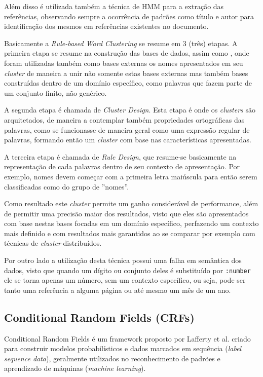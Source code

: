 Além disso é utilizada também a técnica de HMM \cite{Rabiner-HMM-Speech} para a extração das referências, observando sempre a ocorrência de padrões como título e autor para identificação dos mesmos em referências existentes no documento.

Basicamente a \textit{Rule-based Word Clustering} se resume em 3 (três) etapas. A primeira etapa se resume na construção das bases de dados, assim como \cite{Han-SVM}, onde foram utilizadas também como bases externas os nomes apresentados em seu \textit{cluster} de maneira a unir não somente estas bases externas mas também bases construídas dentro de um domínio específico, como palavras que fazem parte de um conjunto finito, não genérico.

A segunda etapa é chamada de \textit{Cluster Design}. Esta etapa é onde os \textit{clusters} são arquitetados, de maneira a contemplar também propriedades ortográficas das palavras, como se funcionasse de maneira geral como uma expressão regular de palavras, formando então um \textit{cluster} com base nas características apresentadas.

A terceira etapa é chamada de \textit{Rule Design}, que resume-se basicamente na representação de cada palavras dentro de seu contexto de apresentação. Por exemplo, nomes devem começar com a primeira letra maiúscula para então serem classificadas como do grupo de ''nomes''.

Como resultado este \textit{cluster} permite um ganho considerável de performance, além de permitir uma precisão maior dos resultados, visto que eles são apresentados com base nestas bases focadas em um domínio específico, perfazendo um contexto mais definido e com resultados mais garantidos ao se comparar por exemplo com técnicas de \textit{cluster} distribuídos.

Por outro lado a utilização desta técnica possui uma falha em semântica dos dados, visto que quando um dígito ou conjunto deles é substituído por \texttt{:number} ele se torna apenas um número, sem um contexto específico, ou seja, pode ser tanto uma referência a alguma página ou até mesmo um mês de um ano.

\subsection{Conditional Random Fields (CRFs)}


Conditional Random Fields é um framework proposto por Lafferty et al. \cite{crf} criado para construir modelos probabilísticos e dados marcados em sequência (\textit{label sequence data}), geralmente utilizados no reconhecimento de padrões e aprendizado de máquinas (\textit{machine learning}).

